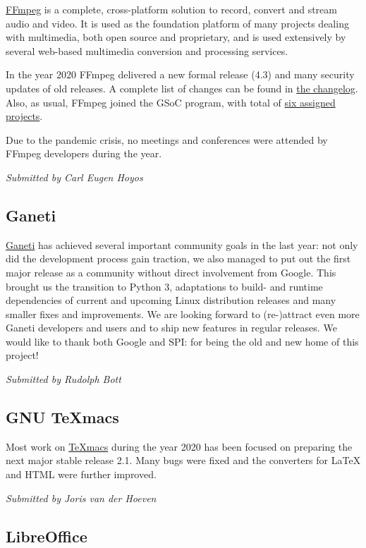 \documentclass[a4paper]{report}
\begin{document}
\href{https://www.ffmpeg.org/}{FFmpeg} is a complete, cross-platform solution to record, convert and stream audio and video. It is used as the foundation platform of many projects dealing with multimedia, both open source and proprietary, and is used extensively by several web-based multimedia conversion and processing services.

In the year 2020 FFmpeg delivered a new formal release (4.3) and many security updates of old releases. A complete list of changes can be found in \href{https://git.ffmpeg.org/gitweb/ffmpeg.git/blob/HEAD:/Changelog}{the changelog}.  Also, as usual, FFmpeg joined the GSoC program, with total of \href{https://trac.ffmpeg.org/wiki/SponsoringPrograms/GSoC/2020/Results}{six assigned projects}.

Due to the pandemic crisis, no meetings and conferences were attended by FFmpeg developers during the year.

{\em Submitted by Carl Eugen Hoyos}

\subsection{Ganeti}

\href{https://ganeti.org/}{Ganeti} has achieved several important community goals in the last year: not only did the development process gain traction, we also managed to put out the first major release as a community without direct involvement from Google. This brought us the transition to Python 3, adaptations to build- and runtime dependencies of current and upcoming Linux distribution releases and many smaller fixes and improvements. We are looking forward to (re-)attract even more Ganeti developers and users and to ship new features in regular releases. We would like to thank both Google and SPI: for being the old and new home of this project!

{\em Submitted by Rudolph Bott}

\subsection{GNU TeXmacs}

Most work on \href{https://www.texmacs.org/}{TeXmacs} during the year 2020 has been focused on preparing the next major stable release 2.1.  Many bugs were fixed and the converters for LaTeX and HTML were further improved.

{\em Submitted by Joris van der Hoeven}

\subsection{LibreOffice}
\end{document}
